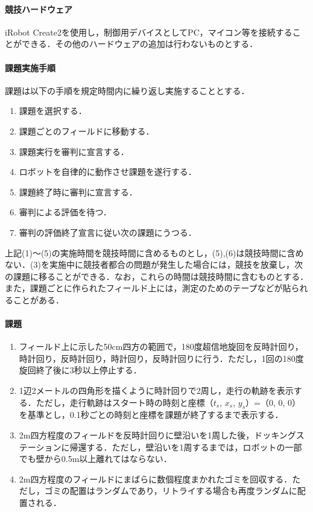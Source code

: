 \documentclass[submit]{ipsj}
\begin{document}
\paragraph*{競技ハードウェア}

iRobot Create2を使用し，制御用デバイスとしてPC，マイコン等を接続することができる．その他のハードウェアの追加は行わないものとする．
\paragraph*{課題実施手順}
課題は以下の手順を規定時間内に繰り返し実施することとする．
\begin{enumerate}
\item 課題を選択する．
\item 課題ごとのフィールドに移動する．
\item 課題実行を審判に宣言する．
\item ロボットを自律的に動作させ課題を遂行する．
\item 課題終了時に審判に宣言する．
\item 審判による評価を待つ．
\item 審判の評価終了宣言に従い次の課題にうつる．
\end{enumerate}

上記(1)〜(5)の実施時間を競技時間に含めるものとし，(5),(6)は競技時間に含めない．(3)を実施中に競技者都合の問題が発生した場合には，競技を放棄し，次の課題に移ることができる．なお，これらの時間は競技時間に含むものとする．また，課題ごとに作られたフィールド上には，測定のためのテープなどが貼られることがある．

\paragraph*{課題}
\begin{enumerate}
\item フィールド上に示した50cm四方の範囲で，180度超信地旋回を反時計回り，時計回り，反時計回り，時計回り，反時計回りに行う．ただし，1回の180度旋回終了後に3秒以上停止する．
\item 1辺2メートルの四角形を描くように時計回りで2周し，走行の軌跡を表示する．ただし，走行軌跡はスタート時の時刻と座標（$t_s$, $x_s$, $y_s$）=（0, 0, 0）を基準とし，0.1秒ごとの時刻と座標を課題が終了するまで表示する．
\item 2m四方程度のフィールドを反時計回りに壁沿いを1周した後，ドッキングステーションに帰還する．ただし，壁沿いを1周するまでは，ロボットの一部でも壁から0.5m以上離れてはならない．
\item 2m四方程度のフィールドにまばらに数個程度まかれたゴミを回収する．ただし，ゴミの配置はランダムであり，リトライする場合も再度ランダムに配置される．
\end{enumerate}
\end{document}
